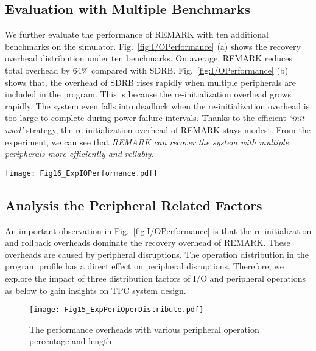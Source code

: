 \subsection{Evaluation with Multiple Benchmarks} \label{sec:expEvaluation}
\vspace{-5pt}
% 
We further evaluate the performance of REMARK with ten additional benchmarks on the simulator.
Fig.~\ref{fig:I/OPerformance} (a) shows the recovery overhead distribution under ten benchmarks.
On average, REMARK reduces total overhead by 64\% compared with SDRB.
Fig.~\ref{fig:I/OPerformance} (b) shows that, the overhead of SDRB rises rapidly when multiple peripherals are included in the program.
This is because the re-initialization overhead grows rapidly.
The system even falls into deadlock when the re-initialization overhead is too large to complete during power failure intervals.
Thanks to the efficient \emph{`init-used'} strategy, the re-initialization overhead of REMARK stays modest.
From the experiment, we can see that \emph{REMARK can recover the system with multiple peripherals more efficiently and reliably}.

%
\begin{figure*}[t]
    \centering
    \texttt{[image: Fig16\_ExpIOPerformance.pdf]}
    \vspace{-5pt}
    \caption{Recover overheads comparison between REMARK and SDRB.}
    \vspace{-0pt}
    \label{fig:I/OPerformance}
\end{figure*}

\subsection{Analysis the Peripheral Related Factors} \label{sec:expParaAnalysis}
\vspace{-5pt}
%
An important observation in Fig.~\ref{fig:I/OPerformance} is that the re-initialization and rollback overheads dominate the recovery overhead of REMARK.
These overheads are caused by peripheral disruptions.
The operation distribution in the program profile has a direct effect on peripheral disruptions.
Therefore, we explore the impact of three distribution factors of I/O and peripheral operations as below to gain insights on TPC system design.

%
\begin{figure}[t]
    \centering
    \texttt{[image: Fig15\_ExpPeriOperDistribute.pdf]}
    \vspace{-5pt}
    \caption{{The performance overheads with various peripheral operation percentage and length.}}
    \vspace{-5pt}
    \label{fig:ExpPeriOperDistribute}
\end{figure}

